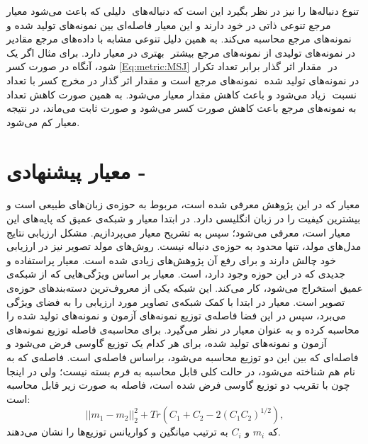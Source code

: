 دلیلی که باعث می‌شود معیار
 ‎
 تنوع دنباله‌ها را نیز در نظر بگیرد این است که دنباله‌های مرجع تنوعی ذاتی در خود دارند و  این معیار فاصله‌ای بین نمونه‌های تولید شده و نمونه‌های مرجع محاسبه می‌کند. به همین دلیل تنوعی مشابه با داده‌های مرجع  مقادیر بهتری در معیار دارد. برای مثال اگر یک
 ‎\ngram{}
    در نمونه‌های تولیدی از نمونه‌های مرجع بیشتر شود، آنگاه در صورت کسر
 \ref{Eq:metric:MSJ}
مقدار اثر گذار برابر تعداد تکرار
 ‎\ngram{}
   در نمونه‌های مرجع است و مقدار اثر گذار در  مخرج کسر با تعداد
 ‎\ngram{}
    در نمونه‌های تولید شده زیاد می‌شود و باعث کاهش مقدار معیار می‌شود. به همین صورت کاهش تعداد 
‎ \ngram{}
     نسبت به نمونه‌های مرجع باعث کاهش صورت کسر می‌شود  و صورت ثابت می‌ماند، در نتیجه معیار کم می‌شود.

\section{ معیار پیشنهادی -  }\label{Metric:FBD}
معیار 
که در این پژوهش معرفی شده است، مربوط به حوزه‌ی زبان‌های طبیعی است و بیشترین کیفیت را در زبان انگلیسی دارد.
در ابتدا معیار
\cite{heusel2017gans}
و شبکه‌ی عمیق
\cite{devlin2018bert}
که پایه‌های این معیار است، معرفی می‌شود؛ سپس به تشریح معیار
می‌پردازیم.
\newline
مشکل ارزیابی نتایج مدل‌های مولد، تنها محدود به حوزه‌ی دنباله نیست. روش‌های مولد تصویر نیز در ارزیابی خود چالش دارند و برای رفع آن پژوهش‌های زیادی شده است. معیار پراستفاده و جدیدی که در این حوزه وجود دارد،
است.
معیار
بر اساس ویژگی‌هایی که از شبکه‌ی عمیق
استخراج می‌شود، کار می‌کند. این شبکه یکی از معروف‌ترین دسته‌بندهای حوزه‌ی تصویر است. معیار
در ابتدا با کمک شبکه‌ی 
تصاویر مورد ارزیابی را به فضای ویژگی می‌برد، سپس در این فضا فاصله‌ی توزیع نمونه‌های آزمون و نمونه‌های تولید شده را محاسبه کرده و به عنوان معیار در نظر می‌گیرد.
برای محاسبه‌ی فاصله توزیع نمونه‌های آزمون و نمونه‌های تولید شده، برای هر کدام یک توزیع گاوسی فرض می‌شود و فاصله‌ای که بین این دو توزیع محاسبه می‌شود، براساس فاصله‌ی
است. فاصله‌ی
که به نام
هم شناخته می‌شود، در حالت کلی قابل محاسبه به فرم بسته نیست؛ ولی در اینجا چون با تقریب دو توزیع گاوسی فرض شده است، فاصله به صورت زیر قابل محاسبه است:
\begin{equation}
{||m_1-m_2||}_2^2 + Tr( C_1 + C_2 -2(C_1C_2)^{1/2}),
\end{equation}
که $m_i$ و $C_i$  به ترتیب میانگین و کواریانس توزیع‌ها را نشان می‌دهند.
